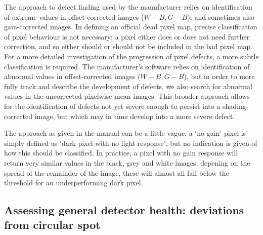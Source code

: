 \documentclass[\main/IO-Pixels.tex]{subfiles}
\begin{document}
The approach to defect finding used by the manufacturer relies on identification of extreme values in offset-corrected images ($W-B, G-B$), and sometimes also gain-corrected images. In defining an official dead pixel map, precise classification of pixel behaviour is not necessary;  a pixel either does or does not need further correction, and so either should or should not be included in the bad pixel map. For a more detailed investigation of the progression of pixel defects, a more subtle classification is required. The manufacturer's software relies on identification of abnormal values in offset-corrected images ($W-B, G-B$), but in order to more fully track and describe the development of defects, we also search for abnormal values in the uncorrected pixelwise mean images. This broader approach allows for the identification of defects not yet severe enough to persist into a shading-corrected image, but which may in time develop into a more severe defect.

The approach as given in the manual can be a little vague; a `no gain' pixel is simply defined as `dark pixel with no light response', but no indication is given of how this should be classified. In practice, a pixel with no gain response will return very similar values in the black, grey and white images; depening on the spread of the remainder of the image, these will almost all fall below the threshold for an underperforming dark pixel.  


\subsection{Assessing general detector health: deviations from circular spot}
\end{document}
